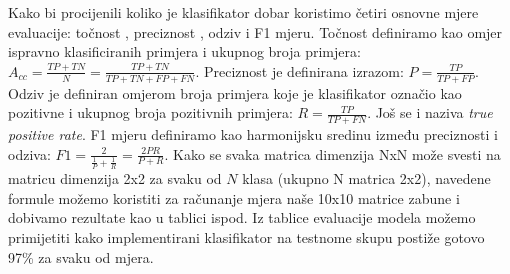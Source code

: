 \documentclass[times, utf8, diplomski]{fer}
\theoremstyle{definition}
\begin{document}
Kako bi procijenili koliko je klasifikator dobar koristimo četiri osnovne mjere evaluacije: točnost , preciznost , odziv  i F1 mjeru.
\newline
Točnost definiramo kao omjer ispravno klasificiranih primjera i ukupnog broja primjera:
$A_{cc} = \frac{TP + TN}{N} = \frac{TP + TN}{TP + TN + FP + FN}$.
\newline
Preciznost je definirana izrazom: $P = \frac{TP}{TP + FP}$.
\newline
Odziv je definiran omjerom broja primjera koje je klasifikator označio kao pozitivne i ukupnog broja pozitivnih primjera:
$R = \frac{TP}{TP + FN}$. Još se i naziva \textit{true positive rate}.
\newline
F1 mjeru definiramo kao harmonijsku sredinu između preciznosti i odziva:
$F1 = \frac{2}{\frac{1}{P} + \frac{1}{R}} = \frac{2PR}{P + R}$. Kako se svaka matrica dimenzija NxN može svesti na matricu dimenzija 2x2 za svaku od $N$ klasa (ukupno N matrica 2x2), navedene formule možemo koristiti za računanje mjera naše 10x10 matrice zabune i dobivamo rezultate kao u tablici ispod.
\newline
Iz tablice evaluacije modela možemo primijetiti kako implementirani klasifikator na testnome skupu postiže gotovo 97\% za svaku od mjera.
\end{document}
